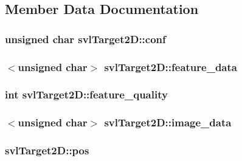 \subsection{Member Data Documentation}
\hypertarget{structsvl_target2_d_adae08264a579759ab62b38ba347dc196}{
\subsubsection[{conf}]{\setlength{\rightskip}{0pt plus 5cm}unsigned char svl\-Target2\-D\-::conf}}\label{structsvl_target2_d_adae08264a579759ab62b38ba347dc196}
\hypertarget{structsvl_target2_d_a4450e7da880415189fd3f0714cf18ca5}{
\subsubsection[{feature\-\_\-data}]{$<$unsigned char$>$ svl\-Target2\-D\-::feature\-\_\-data}}\label{structsvl_target2_d_a4450e7da880415189fd3f0714cf18ca5}
\hypertarget{structsvl_target2_d_a3eaf1d73276713940d630435ef04ff8f}{
\subsubsection[{feature\-\_\-quality}]{\setlength{\rightskip}{0pt plus 5cm}int svl\-Target2\-D\-::feature\-\_\-quality}}\label{structsvl_target2_d_a3eaf1d73276713940d630435ef04ff8f}
\hypertarget{structsvl_target2_d_a26ffc8da663569e7a52982446600a476}{
\subsubsection[{image\-\_\-data}]{$<$unsigned char$>$ svl\-Target2\-D\-::image\-\_\-data}}\label{structsvl_target2_d_a26ffc8da663569e7a52982446600a476}
\hypertarget{structsvl_target2_d_ab68be6f073df6ae78c134a2515873b6c}{
\subsubsection[{pos}]{ svl\-Target2\-D\-::pos}}\label{structsvl_target2_d_ab68be6f073df6ae78c134a2515873b6c}
